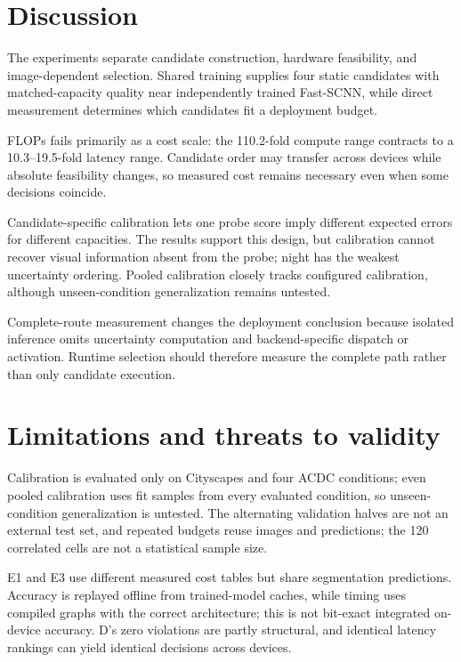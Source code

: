 \documentclass[a4paper,review,12pt]{elsarticle}
\begin{document}
\section{Discussion}
\label{sec:discussion}

The experiments separate candidate construction, hardware feasibility, and image-dependent selection. Shared training supplies four static candidates with matched-capacity quality near independently trained Fast-SCNN, while direct measurement determines which candidates fit a deployment budget.

FLOPs fails primarily as a cost scale: the 110.2-fold compute range contracts to a 10.3--19.5-fold latency range. Candidate order may transfer across devices while absolute feasibility changes, so measured cost remains necessary even when some decisions coincide.

Candidate-specific calibration lets one probe score imply different expected errors for different capacities. The results support this design, but calibration cannot recover visual information absent from the probe; night has the weakest uncertainty ordering. Pooled calibration closely tracks configured calibration, although unseen-condition generalization remains untested.

Complete-route measurement changes the deployment conclusion because isolated inference omits uncertainty computation and backend-specific dispatch or activation. Runtime selection should therefore measure the complete path rather than only candidate execution.

\section{Limitations and threats to validity}
\label{sec:limitations}

Calibration is evaluated only on Cityscapes and four ACDC conditions; even pooled calibration uses fit samples from every evaluated condition, so unseen-condition generalization is untested. The alternating validation halves are not an external test set, and repeated budgets reuse images and predictions; the 120 correlated cells are not a statistical sample size.

E1 and E3 use different measured cost tables but share segmentation predictions. Accuracy is replayed offline from trained-model caches, while timing uses compiled graphs with the correct architecture; this is not bit-exact integrated on-device accuracy. D's zero violations are partly structural, and identical latency rankings can yield identical decisions across devices.
\end{document}
